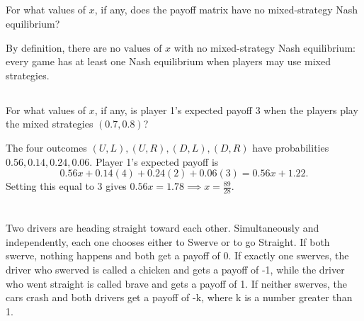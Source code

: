 \documentclass[newpages]{assignment}
\begin{document}
\subsection{}

\begin{problem}
    For what values of \(x\), if any, does the payoff matrix have no mixed-strategy
    Nash equilibrium?
\end{problem}

\begin{solution}
    By definition, there are \(\boxed{\text{no values of }x}\)
    with no mixed-strategy Nash equilibrium: every game has at least
    one Nash equilibrium when players may use mixed strategies.
\end{solution}

\subsection{}

\begin{problem}
    For what values of \(x\), if any, is player 1's expected payoff 3 when the
    players play the mixed strategies \((0.7, 0.8)\)?
\end{problem}

\begin{solution}
    The four
    outcomes \((U,L),(U,R),(D,L),(D,R)\) have probabilities
    \(0.56,0.14,0.24,0.06\). Player 1's expected payoff is
    \[
        0.56x+0.14(4)+0.24(2)+0.06(3)
        =0.56x+1.22.
    \]
    Setting this equal to \(3\) gives \(0.56x=1.78 \implies \boxed{x=\frac{89}{28}}\).
\end{solution}

\section{}

\begin{problem}
    Two drivers are heading straight toward each other. Simultaneously and independently, each one chooses either to Swerve or to go Straight. If both swerve, nothing happens and both get a payoff of 0. If exactly one swerves, the driver who swerved is called a chicken and gets a payoff of -1, while the driver who went straight is called brave and gets a payoff of 1. If neither swerves, the cars crash and both drivers get a payoff of -k, where k is a number greater than 1.
\end{problem}
\end{document}
